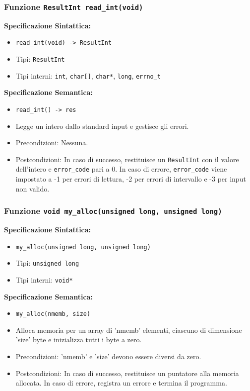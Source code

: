 \documentclass[11pt]{scrartcl} %
\begin{document}
\subsubsection{Funzione \texttt{ResultInt read\_int(void)}}

\textbf{Specificazione Sintattica:}
\begin{itemize}
	\item \texttt{read\_int(void) -> ResultInt}
	\item Tipi: \texttt{ResultInt}
	\item Tipi interni: \texttt{int}, \texttt{char[]}, \texttt{char*}, \texttt{long}, \texttt{errno\_t}
\end{itemize}

\textbf{Specificazione Semantica:}
\begin{itemize}
	\item \texttt{read\_int() -> res}
	\item Legge un intero dallo standard input e gestisce gli errori.
	\item Precondizioni: Nessuna.
	\item Postcondizioni: In caso di successo, restituisce un \texttt{ResultInt} con il valore dell'intero e \texttt{error\_code} pari a 0. In caso di errore, \texttt{error\_code} viene impostato a -1 per errori di lettura, -2 per errori di intervallo e -3 per input non valido.
\end{itemize}

\subsubsection{Funzione \texttt{void my\_alloc(unsigned long, unsigned long)}}

\textbf{Specificazione Sintattica:}
\begin{itemize}
	\item \texttt{my\_alloc(unsigned long, unsigned long)}
	\item Tipi: \texttt{unsigned long}
	\item Tipi interni: \texttt{void*}
\end{itemize}

\textbf{Specificazione Semantica:}
\begin{itemize}
	\item \texttt{my\_alloc(nmemb, size)}
	\item Alloca memoria per un array di 'nmemb' elementi, ciascuno di dimensione 'size' byte e inizializza tutti i byte a zero.
	\item Precondizioni: 'nmemb' e 'size' devono essere diversi da zero.
	\item Postcondizioni: In caso di successo, restituisce un puntatore alla memoria allocata. In caso di errore, registra un errore e termina il programma.
\end{itemize}
\end{document}
